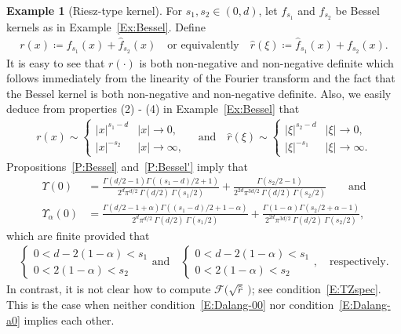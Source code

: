\documentclass[a4paper,11pt]{article}%
\theoremstyle{plain}
\theoremstyle{definition}
\newtheorem{example}[theorem]{Example}
\numberwithin{equation}{section}
\begin{document}
\begin{example}[Riesz-type kernel]\label{Ex:Riesz-T}
  For $s_1, s_2\in (0,d)$, let $f_{s_1}$ and $f_{s_2}$ be Bessel kernels as in
  Example~\ref{Ex:Bessel}. Define
  \begin{align*}
    r(x)\coloneqq f_{s_1}(x) + \widehat{f}_{s_2}(x) \quad \text{or equivalently} \quad
    \widehat{r}(\xi)\coloneqq \widehat{f}_{s_1}(x) + f_{s_2}(x).
  \end{align*}
  It is easy to see that $r(\cdot)$ is both non-negative and non-negative definite which follows
  immediately from the linearity of the Fourier transform and the fact that the Bessel kernel is
  both non-negative and non-negative definite. Also, we easily deduce from properties (2) - (4) in
  Example~\ref{Ex:Bessel} that
  \begin{align*}
    r(x) \sim
    \begin{cases}
      |x|^{s_1-d} & |x| \to 0, \\
      |x|^{-s_2}  & |x| \to \infty,
    \end{cases}
    \quad \text{and} \quad
    \widehat{r}(\xi) \sim
    \begin{cases}
      |\xi|^{s_2 - d} & |\xi| \to 0, \\
      |\xi|^{-s_1}    & |\xi| \to \infty.
    \end{cases}
  \end{align*}
  Propositions~\ref{P:Bessel} and~\ref{P:Bessel'} imply that
  \begin{align}\label{E:RieszType-0}
    \Upsilon(0) & =
    \frac{\Gamma\left(d/2 -1\right) \Gamma\left((s_1 - d)/2 + 1\right)}{2^d \pi^{d/2} \: \Gamma(d/2)\:\Gamma\left(s_1/2\right)}
    + \frac{\Gamma\left(s_2/2 - 1\right)}{2^{2d} \pi^{3d/2} \: \Gamma(d/2) \: \Gamma\left(s_2/2\right)} \qquad \text{and} \\
    \Upsilon_{\alpha}(0) & =
    \frac{\Gamma\left(d/2 -1 + \alpha\right) \Gamma\left((s_1 - d)/2 + 1 - \alpha\right)}{2^d \pi^{d/2} \: \Gamma(d/2)\:\Gamma\left(s_1/2\right)}
    + \frac{\Gamma\left(1 - \alpha\right) \Gamma\left( s_2/2 + \alpha - 1\right)}{2^{2d} \pi^{3d/2} \: \Gamma(d/2) \: \Gamma\left(s_2/2\right)},
    \label{E:RieszType}
  \end{align}
  which are finite provided that
	\begin{align}\label{E:RieszTypeCond}
    \begin{cases}
      0 < d - 2(1-\alpha) < s_1 \\
      0 < 2(1-\alpha) < s_2
    \end{cases}
    \text{and} \quad
    \begin{cases}
      0 < d - 2(1-\alpha) < s_1 \\
      0 < 2(1-\alpha) < s_2
    \end{cases},
    \quad \text{respectively.}
	\end{align}
  In contrast, it is not clear how to compute $\mathcal{F}\big(\sqrt{\widehat{r}}\:\big)$; see
  condition~\eqref{E:TZspec}. This is the case when neither condition~\eqref{E:Dalang-00} nor
  condition~\eqref{E:Dalang-a0} implies each other.
\end{example}
\end{document}
